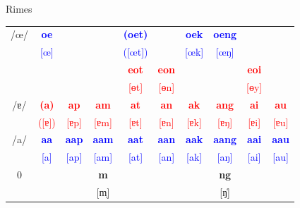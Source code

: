 \documentclass{beamer}
\begin{document}
\begin{frame}[fragile]{Rimes}
\begin{table}
\begin{tabular}{c|c c c c c c c c c}
    /œ/ & \textcolor{blue}{\textbf{oe}} & & & \textcolor{blue}{\textbf{(oet)}} & & \textcolor{blue}{\textbf{oek}} & \textcolor{blue}{\textbf{oeng}} & & \\
     & \textcolor{blue}{[œ]} & & & \textcolor{blue}{([œt])} & & \textcolor{blue}{[œk]} & \textcolor{blue}{[œŋ]} & & \\
     & & & & \textcolor{red}{\textbf{eot}} & \textcolor{red}{\textbf{eon}} & & & \textcolor{red}{\textbf{eoi}} & \\
     & & & & \textcolor{red}{[ɵt]} & \textcolor{red}{[ɵn]} & & & \textcolor{red}{[ɵy]} & \\ \hline
    /ɐ/ & \textcolor{red}{\textbf{(a)}} & \textcolor{red}{\textbf{ap}} & \textcolor{red}{\textbf{am}} & \textcolor{red}{\textbf{at}} & \textcolor{red}{\textbf{an}} & \textcolor{red}{\textbf{ak}} & \textcolor{red}{\textbf{ang}} & \textcolor{red}{\textbf{ai}} & \textcolor{red}{\textbf{au}} \\
     & \textcolor{red}{([ɐ])} & \textcolor{red}{[ɐp]} & \textcolor{red}{[ɐm]} & \textcolor{red}{[ɐt]} & \textcolor{red}{[ɐn]} & \textcolor{red}{[ɐk]} & \textcolor{red}{[ɐŋ]} & \textcolor{red}{[ɐi]} & \textcolor{red}{[ɐu]} \\ \hline
    /a/ & \textcolor{blue}{\textbf{aa}} & \textcolor{blue}{\textbf{aap}} & \textcolor{blue}{\textbf{aam}} & \textcolor{blue}{\textbf{aat}} & \textcolor{blue}{\textbf{aan}} & \textcolor{blue}{\textbf{aak}} & \textcolor{blue}{\textbf{aang}} & \textcolor{blue}{\textbf{aai}} & \textcolor{blue}{\textbf{aau}} \\
     & \textcolor{blue}{[a]} & \textcolor{blue}{[ap]} & \textcolor{blue}{[am]} & \textcolor{blue}{[at]} & \textcolor{blue}{[an]} & \textcolor{blue}{[ak]} & \textcolor{blue}{[aŋ]} & \textcolor{blue}{[ai]} & \textcolor{blue}{[au]} \\ \hline
    0 & & & \textbf{m} & & & & \textbf{ng} & & \\
     & & & [m̩] & & & & [ŋ̍] & & \\ \hline
\end{tabular}
\end{table}

\end{frame}
\end{document}
